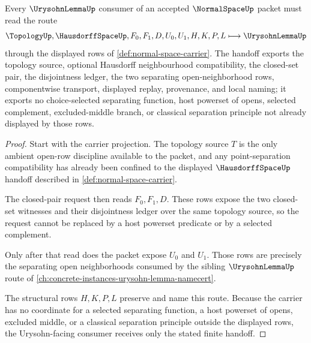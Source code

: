 \begin{theorem}
\label{thm:normal-space-urysohn-handoff}
Every $\UrysohnLemmaUp$ consumer of an accepted $\NormalSpaceUp$ packet must read the route
$$
\TopologyUp,\HausdorffSpaceUp,F_0,F_1,D,U_0,U_1,H,K,P,L
\longmapsto
\UrysohnLemmaUp
$$
through the displayed rows of \autoref{def:normal-space-carrier}. The handoff exports the topology source, optional Hausdorff neighbourhood compatibility, the closed-set pair, the disjointness ledger, the two separating open-neighborhood rows, componentwise transport, displayed replay, provenance, and local naming; it exports no choice-selected separating function, host powerset of opens, selected complement, excluded-middle branch, or classical separation principle not already displayed by those rows.
\end{theorem}
\begin{proof}
Start with the carrier projection. The topology source $T$ is the only ambient open-row discipline available to the packet, and any point-separation compatibility has already been confined to the displayed $\HausdorffSpaceUp$ handoff described in \autoref{def:normal-space-carrier}.

The closed-pair request then reads $F_0,F_1,D$. These rows expose the two closed-set witnesses and their disjointness ledger over the same topology source, so the request cannot be replaced by a host powerset predicate or by a selected complement.

Only after that read does the packet expose $U_0$ and $U_1$. Those rows are precisely the separating open neighborhoods consumed by the sibling $\UrysohnLemmaUp$ route of \autoref{ch:concrete-instances-urysohn-lemma-namecert}.

The structural rows $H,K,P,L$ preserve and name this route. Because the carrier has no coordinate for a selected separating function, a host powerset of opens, excluded middle, or a classical separation principle outside the displayed rows, the Urysohn-facing consumer receives only the stated finite handoff.
\end{proof}

